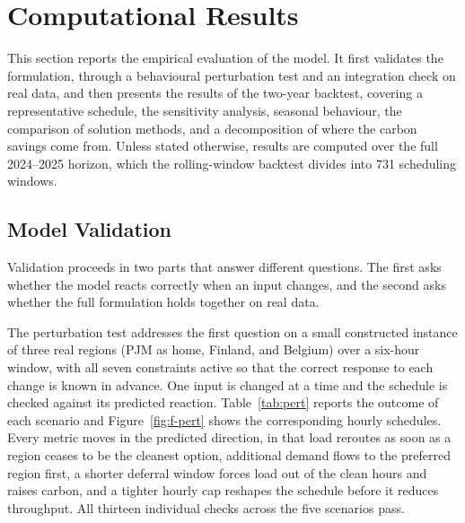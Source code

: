 \section{Computational Results}
\label{sec:results}

This section reports the empirical evaluation of the model. It first validates the formulation, through a behavioural perturbation test and an integration check on real data, and then presents the results of the two-year backtest, covering a representative schedule, the sensitivity analysis, seasonal behaviour, the comparison of solution methods, and a decomposition of where the carbon savings come from. Unless stated otherwise, results are computed over the full 2024--2025 horizon, which the rolling-window backtest divides into 731 scheduling windows.

\FloatBarrier
\subsection{Model Validation}
\label{sec:res-validation}

Validation proceeds in two parts that answer different questions. The first asks whether the model reacts correctly when an input changes, and the second asks whether the full formulation holds together on real data.

The perturbation test addresses the first question on a small constructed instance of three real regions (PJM as home, Finland, and Belgium) over a six-hour window, with all seven constraints active so that the correct response to each change is known in advance. One input is changed at a time and the schedule is checked against its predicted reaction. Table~\ref{tab:pert} reports the outcome of each scenario and Figure~\ref{fig:f-pert} shows the corresponding hourly schedules. Every metric moves in the predicted direction, in that load reroutes as soon as a region ceases to be the cleanest option, additional demand flows to the preferred region first, a shorter deferral window forces load out of the clean hours and raises carbon, and a tighter hourly cap reshapes the schedule before it reduces throughput. All thirteen individual checks across the five scenarios pass.


